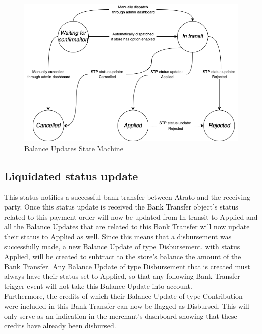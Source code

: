 \begin{figure}[h!]
    \centering
    \includegraphics[scale = 0.5]{assets/diagrams/BankTransfersStateMachine.png}
    \caption{Balance Updates State Machine}\label{fig:state_machine_bank_transfers}
\end{figure}

\subsection{Liquidated status update}

This status notifies a successful bank transfer between Atrato and the receiving party. Once this status update is received the Bank Transfer object’s status related to this payment order will now be updated from In transit to Applied and all the Balance Updates that are related to this Bank Transfer will now update their status to Applied as well. Since this means that a disbursement was successfully made, a new Balance Update of type Disbursement, with status Applied, will be created to subtract to the store’s balance the amount of the Bank Transfer. Any Balance Update of type Disbursement that is created must always have their status set to Applied, so that any following Bank Transfer trigger event will not take this Balance Update into account.\\

Furthermore, the credits of which their Balance Update of type Contribution were included in this Bank Transfer can now be flagged as Disbursed. This will only serve as an indication in the merchant’s dashboard showing that these credits have already been disbursed.

